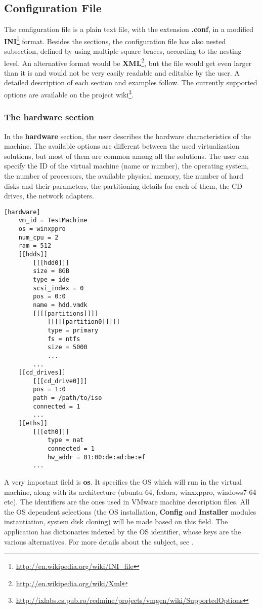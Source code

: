 \subsection{Configuration File}
\label{sub-sec:config-file}
The configuration file is a plain text file, with the extension \textbf{.conf},
in a modified
\textbf{INI}\footnote{\url{http://en.wikipedia.org/wiki/INI\_file}} format.
Besides the sections, the configuration file has also nested subsection,
defined by using multiple square braces, according to the nesting level. An
alternative format would be
\textbf{XML}\footnote{\url{http://en.wikipedia.org/wiki/Xml}}, but the file
would get even larger than it is and would not be very easily readable and
editable by the user. A detailed description of each section and examples
follow. The currently supported options are available on the project
wiki\footnote{\url{http://ixlabs.cs.pub.ro/redmine/projects/vmgen/wiki/SupportedOptions}}.

\subsubsection{The hardware section}
\label{sub-sub-sec:hardware-sec}
In the \textbf{hardware} section, the user describes the hardware
characteristics of the machine. The available options are different between the
used virtualization solutions, but most of them are common among all the
solutions. The user can specify the ID of the virtual machine (name or number),
the operating system, the number of processors, the available physical memory,
the number of hard disks and their parameters, the partitioning details for
each of them, the CD drives, the network adapters. 

\lstset{caption=sample hardware section,label=lst:hardware-section}
\begin{lstlisting}
[hardware]
	vm_id = TestMachine
	os = winxppro
	num_cpu = 2
	ram = 512
	[[hdds]]
		[[[hdd0]]]
		size = 8GB
		type = ide
		scsi_index = 0
		pos = 0:0
		name = hdd.vmdk
		[[[[partitions]]]]
			[[[[[partition0]]]]]
			type = primary
			fs = ntfs
			size = 5000
			...
		...
	[[cd_drives]]
		[[[cd_drive0]]]
		pos = 1:0
		path = /path/to/iso
		connected = 1
		...
	[[eths]]
		[[[eth0]]]
			type = nat
			connected = 1
			hw_addr = 01:00:de:ad:be:ef
		...
\end{lstlisting}

A very important field is \textbf{os}. It specifies the OS which will run in
the virtual machine, along with its architecture (ubuntu-64, fedora, winxxppro,
windows7-64 etc). The identifiers are the ones used in VMware machine
description files. All the OS dependent selections (the OS installation,
\textbf{Config} and \textbf{Installer} modules instantiation, system disk
cloning) will be made based on this field. The application has dictionaries
indexed by the OS identifier, whose keys are the various alternatives. For more
details about the subject, see .


